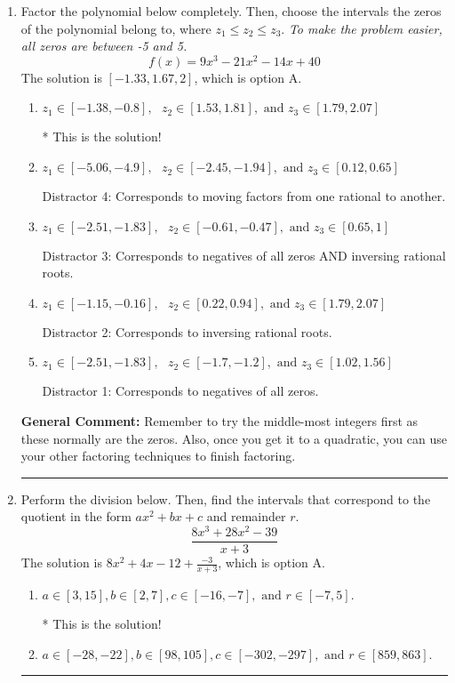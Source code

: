 \documentclass{extbook}[14pt]
\newcommand{\litem}[1]{\item #1

\rule{\textwidth}{0.4pt}}
\begin{document}
\begin{enumerate}\litem{
Factor the polynomial below completely. Then, choose the intervals the zeros of the polynomial belong to, where $z_1 \leq z_2 \leq z_3$. \textit{To make the problem easier, all zeros are between -5 and 5.}
\[ f(x) = 9x^{3} -21 x^{2} -14 x + 40 \]The solution is \( [-1.33, 1.67, 2] \), which is option A.\begin{enumerate}[label=\Alph*.]
\item \( z_1 \in [-1.38, -0.8], \text{   }  z_2 \in [1.53, 1.81], \text{   and   } z_3 \in [1.79, 2.07] \)

* This is the solution!
\item \( z_1 \in [-5.06, -4.9], \text{   }  z_2 \in [-2.45, -1.94], \text{   and   } z_3 \in [0.12, 0.65] \)

 Distractor 4: Corresponds to moving factors from one rational to another.
\item \( z_1 \in [-2.51, -1.83], \text{   }  z_2 \in [-0.61, -0.47], \text{   and   } z_3 \in [0.65, 1] \)

 Distractor 3: Corresponds to negatives of all zeros AND inversing rational roots.
\item \( z_1 \in [-1.15, -0.16], \text{   }  z_2 \in [0.22, 0.94], \text{   and   } z_3 \in [1.79, 2.07] \)

 Distractor 2: Corresponds to inversing rational roots.
\item \( z_1 \in [-2.51, -1.83], \text{   }  z_2 \in [-1.7, -1.2], \text{   and   } z_3 \in [1.02, 1.56] \)

 Distractor 1: Corresponds to negatives of all zeros.
\end{enumerate}

\textbf{General Comment:} Remember to try the middle-most integers first as these normally are the zeros. Also, once you get it to a quadratic, you can use your other factoring techniques to finish factoring.
}
\litem{
Perform the division below. Then, find the intervals that correspond to the quotient in the form $ax^2+bx+c$ and remainder $r$.
\[ \frac{8x^{3} +28 x^{2} -39}{x + 3} \]The solution is \( 8x^{2} +4 x -12 + \frac{-3}{x + 3} \), which is option A.\begin{enumerate}[label=\Alph*.]
\item \( a \in [3, 15], b \in [2, 7], c \in [-16, -7], \text{ and } r \in [-7, 5]. \)

* This is the solution!
\item \( a \in [-28, -22], b \in [98, 105], c \in [-302, -297], \text{ and } r \in [859, 863]. \)


\end{enumerate}}
\end{enumerate}
\end{document}
